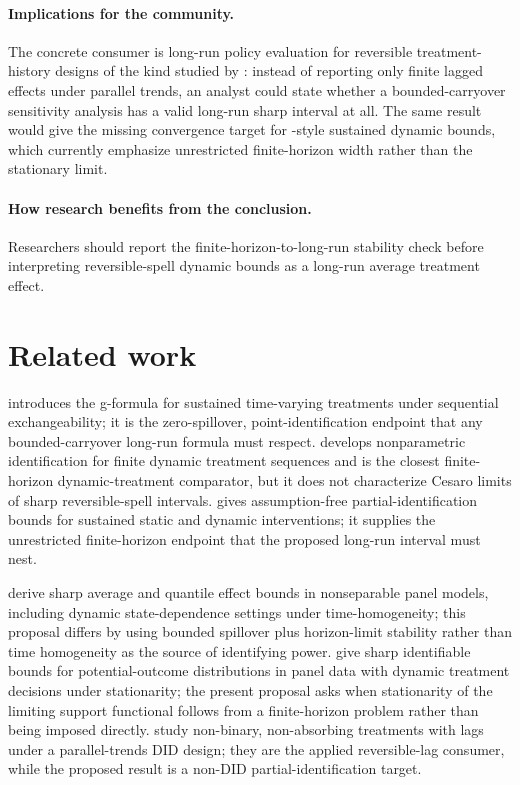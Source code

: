 \documentclass[11pt]{article}
\theoremstyle{definition}
\theoremstyle{plain}
\theoremstyle{remark}
\begin{document}
\paragraph{Implications for the community.}
The concrete consumer is long-run policy evaluation for reversible treatment-history designs of the kind studied by \citet{DeChaisemartinDHaultfoeuille2024}: instead of reporting only finite lagged effects under parallel trends, an analyst could state whether a bounded-carryover sensitivity analysis has a valid long-run sharp interval at all.  The same result would give the missing convergence target for \citet{DiemerShiSwanson2024}-style sustained dynamic bounds, which currently emphasize unrestricted finite-horizon width rather than the stationary limit.

\paragraph{How research benefits from the conclusion.}
Researchers should report the finite-horizon-to-long-run stability check before interpreting reversible-spell dynamic bounds as a long-run average treatment effect.

\section{Related work}
\citet{Robins1986} introduces the g-formula for sustained time-varying treatments under sequential exchangeability; it is the zero-spillover, point-identification endpoint that any bounded-carryover long-run formula must respect.  \citet{Han2021} develops nonparametric identification for finite dynamic treatment sequences and is the closest finite-horizon dynamic-treatment comparator, but it does not characterize Cesaro limits of sharp reversible-spell intervals.  \citet{DiemerShiSwanson2024} gives assumption-free partial-identification bounds for sustained static and dynamic interventions; it supplies the unrestricted finite-horizon endpoint that the proposed long-run interval must nest.

\citet{ChernozhukovFernandezValHahnNewey2013} derive sharp average and quantile effect bounds in nonseparable panel models, including dynamic state-dependence settings under time-homogeneity; this proposal differs by using bounded spillover plus horizon-limit stability rather than time homogeneity as the source of identifying power.  \citet{JunLeeShin2016} give sharp identifiable bounds for potential-outcome distributions in panel data with dynamic treatment decisions under stationarity; the present proposal asks when stationarity of the limiting support functional follows from a finite-horizon problem rather than being imposed directly.  \citet{DeChaisemartinDHaultfoeuille2024} study non-binary, non-absorbing treatments with lags under a parallel-trends DID design; they are the applied reversible-lag consumer, while the proposed result is a non-DID partial-identification target.
\end{document}
